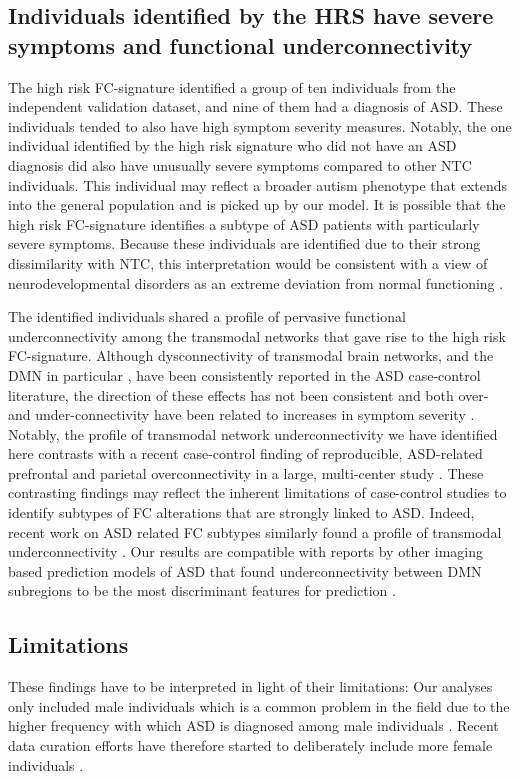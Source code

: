 \documentclass[9pt,lineno]{elife}
\begin{document}
\subsection{Individuals identified by the HRS have severe symptoms and functional underconnectivity}
The high risk FC-signature identified a group of ten individuals from the independent validation dataset, and nine of them had a diagnosis of ASD. These individuals tended to also have high symptom severity measures. Notably, the one individual identified by the high risk signature who did not have an ASD diagnosis did also have unusually severe symptoms compared to other NTC individuals. This individual may reflect a broader autism phenotype that extends into the general population \citep{Baron-Cohen2001-fx} and is picked up by our model. It is possible that the high risk FC-signature identifies a subtype of ASD patients with particularly severe symptoms. Because these individuals are identified due to their strong dissimilarity with NTC, this interpretation would be consistent with a view of neurodevelopmental disorders as an extreme deviation from normal functioning \citep{Marquand2019-ip}.

The identified individuals shared a profile of pervasive functional underconnectivity among the transmodal networks that gave rise to the high risk FC-signature. Although dysconnectivity of transmodal brain networks, and the DMN in particular \citep{Monk2009-go}, have been consistently reported in the ASD case-control literature, the direction of these effects has not been consistent \citep{Padmanabhan2017-an,Hull2016-iu} and both over- and under-connectivity have been related to increases in symptom severity \citep{Assaf2010-jx,Supekar2013-lh}. Notably, the profile of transmodal network underconnectivity we have identified here contrasts with a recent case-control finding of reproducible, ASD-related prefrontal and parietal overconnectivity in a large, multi-center study \citep{Holiga2019-ub}. These contrasting findings may reflect the inherent limitations of case-control studies to identify subtypes of FC alterations that are strongly linked to ASD. Indeed, recent work on ASD related FC subtypes similarly found a profile of transmodal underconnectivity \citep{Tang2019-ww}. Our results are compatible with reports by other imaging based prediction models of ASD that found underconnectivity between DMN subregions to be the most discriminant features for prediction \citep{Abraham2017-vf,Heinsfeld2018-yl,Yahata2016-jk}.

\subsection{Limitations}
These findings have to be interpreted in light of their limitations: Our analyses only included male individuals which is a common problem in the field \citep{Khundrakpam2017-hq,Hong2019-hp} due to the higher frequency with which ASD is diagnosed among male individuals \citep{Lai2014-tf}. Recent data curation efforts have therefore started to deliberately include more female individuals \citep{Di_Martino2017-md,Bedford2019-sz}. 
\end{document}
